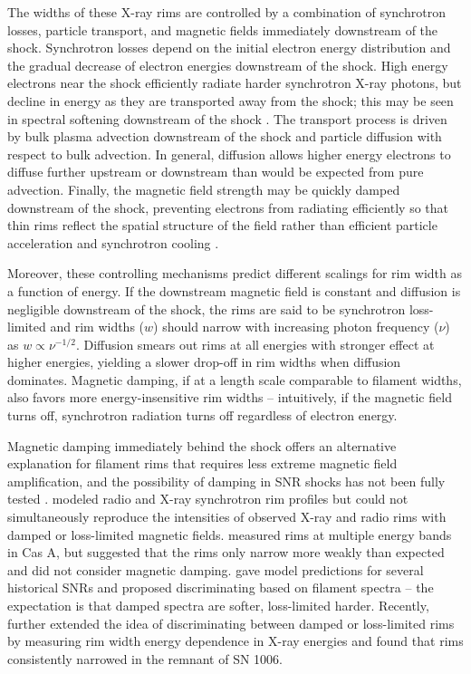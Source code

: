 \documentclass[iop, apj, numberedappendix]{emulateapj}
\begin{document}
The widths of these X-ray rims are controlled by a combination of
synchrotron losses, particle transport, and magnetic fields immediately
downstream of the shock.  Synchrotron losses depend on the initial electron
energy distribution and the gradual decrease of electron energies downstream of
the shock.  High energy electrons near the shock efficiently radiate harder
synchrotron X-ray photons, but decline in energy as they are transported away
from the shock; this may be seen in spectral softening downstream of the shock
\citep[e.g.,][]{cassam-chenai2007}.  The transport process is driven by bulk
plasma advection downstream of the shock and particle diffusion with respect to
bulk advection.  In general, diffusion allows higher energy electrons to
diffuse further upstream or downstream than would be expected from pure
advection.  Finally, the magnetic field strength may be quickly damped
downstream of the shock, preventing electrons from radiating efficiently so
that thin rims reflect the spatial structure of the field rather than efficient
particle acceleration and synchrotron cooling \citep{pohl2005}.

Moreover, these controlling mechanisms predict different scalings for rim width
as a function of energy.  If the downstream magnetic field is constant and
diffusion is negligible downstream of the shock, the rims are said to be
synchrotron loss-limited and rim widths ($w$) should narrow with increasing
photon frequency ($\nu$) as $w \propto \nu^{-1/2}$. Diffusion smears out rims
at all energies with stronger effect at higher energies, yielding a slower
drop-off in rim widths when diffusion dominates.  Magnetic damping, if at a
length scale comparable to filament widths, also favors more energy-insensitive
rim widths -- intuitively, if the magnetic field turns off, synchrotron
radiation turns off regardless of electron energy.

Magnetic damping immediately behind the shock offers an alternative explanation
for filament rims that requires less extreme magnetic field amplification, and
the possibility of damping in SNR shocks has not been fully tested
\citep{pohl2005, marcowith2010}.  \citet{cassam-chenai2007} modeled radio and
X-ray synchrotron rim profiles but could not simultaneously reproduce the
intensities of observed X-ray and radio rims with damped or loss-limited
magnetic fields.  \citet{araya2010} measured rims at multiple energy bands in
Cas A, but suggested that the rims only narrow more weakly than expected and
did not consider magnetic damping.  \citet{rettig2012} gave model predictions
for several historical SNRs and proposed discriminating based on filament
spectra -- the expectation is that damped spectra are softer, loss-limited
harder.  Recently, \citet{ressler2014} further extended the idea of
discriminating between damped or loss-limited rims by measuring rim width
energy dependence in X-ray energies and found that rims consistently narrowed
in the remnant of SN 1006.
\end{document}
